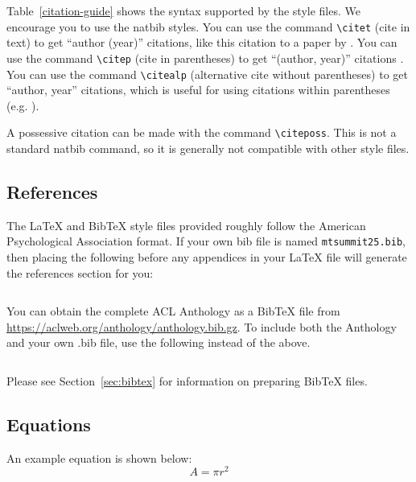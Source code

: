 \documentclass[11pt]{article}
\begin{document}
Table~\ref{citation-guide} shows the syntax supported by the style files.
We encourage you to use the natbib styles.
You can use the command \verb|\citet| (cite in text) to get ``author (year)'' citations, like this citation to a paper by \citet{Gusfield:97}.
You can use the command \verb|\citep| (cite in parentheses) to get ``(author, year)'' citations \citep{Gusfield:97}.
You can use the command \verb|\citealp| (alternative cite without parentheses) to get ``author, year'' citations, which is useful for using citations within parentheses (e.g. \citealp{Gusfield:97}).

A possessive citation can be made with the command \verb|\citeposs|.
This is not a standard natbib command, so it is generally not compatible
with other style files.

\subsection{References}

\nocite{Ando2005,andrew2007scalable,rasooli-tetrault-2015}

The \LaTeX{} and Bib\TeX{} style files provided roughly follow the American Psychological Association format.
If your own bib file is named \texttt{mtsummit25.bib}, then placing the following before any appendices in your \LaTeX{} file will generate the references section for you:
\begin{quote}
\begin{verbatim}

\end{verbatim}
\end{quote}

You can obtain the complete ACL Anthology as a Bib\TeX{} file from \url{https://aclweb.org/anthology/anthology.bib.gz}.
To include both the Anthology and your own .bib file, use the following instead of the above.
\begin{quote}
\begin{verbatim}

\end{verbatim}
\end{quote}

Please see Section~\ref{sec:bibtex} for information on preparing Bib\TeX{} files.

\subsection{Equations}

An example equation is shown below:
\begin{equation}
  \label{eq:example}
  A = \pi r^2
\end{equation}
\end{document}
